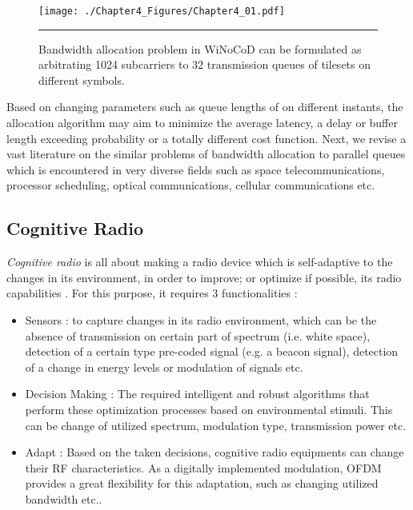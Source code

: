 \begin{figure}[htbp]
  \centering
    \texttt{[image: ./Chapter4\_Figures/Chapter4\_01.pdf]}
    \rule{35em}{0.5pt}
  \caption[Bandwidth allocation problem in WiNoCoD can be formulated as arbitrating 1024 subcarriers to 32 transmission queues of tilesets on different symbols.]{Bandwidth allocation problem in WiNoCoD can be formulated as arbitrating 1024 subcarriers to 32 transmission queues of tilesets on different symbols.} 
  \label{fig:Electron}
\end{figure}

Based on changing parameters such as queue lengths of on different instants, the allocation algorithm may aim to minimize the average latency, a delay or buffer length exceeding probability or a totally different cost function. Next, we revise a vast literature on the similar problems of bandwidth allocation to parallel queues which is encountered in very diverse fields such as space telecommunications, processor scheduling, optical communications, cellular communications etc. 

\subsection{Cognitive Radio}

\textit{Cognitive radio} \cite{mitola2000cognitive} is all about making a radio device which is self-adaptive to the changes in its environment, in order to improve; or optimize if possible, its radio capabilities \cite{palicot2013radio}. For this purpose, it requires 3 functionalities : 


\begin{itemize}
\item Sensors : to capture changes in its radio environment, which can be the absence of transmission on certain part of spectrum (i.e. white space), detection of a certain type pre-coded signal (e.g. a beacon signal), detection of a change in energy levels or modulation of signals etc. 
\item Decision Making :  The required intelligent and robust algorithms that perform these optimization processes based on environmental stimuli. This can be change of utilized spectrum, modulation type, transmission power etc.
\item Adapt : Based on the taken decisions, cognitive radio equipments can change their RF characteristics. As a digitally implemented modulation, OFDM provides a great flexibility for this adaptation, such as changing utilized bandwidth etc..   
\end{itemize}

